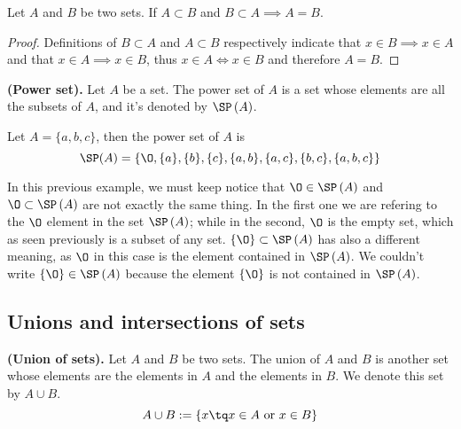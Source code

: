 \begin{proposition}
    Let $A$ and $B$ be two sets. If $A\subset B$ and $B\subset A\implies A = B$.
\end{proposition}
\begin{proof}
    Definitions of $B\subset A$ and $A\subset B$ respectively indicate that $x\in B\implies x\in A$ and that $x\in A\implies x\in B$, thus $x\in A\iff x\in B$ and therefore $A = B$.
\end{proof}

\begin{definition}
    \textbf{(Power set).} Let $A$ be a set. The power set of $A$ is a set whose elements are all the subsets of $A$, and it's denoted by $\SP\left( A \right) $.
\end{definition}
\begin{example}
    Let $A = \{a, b, c\}$, then the power set of $A$ is
    \begin{equation}
    \SP(A) = \lbrace \O, \{a\}, \{b\}, \{c\}, \{a, b\}, \{a, c\}, \{b, c\}, \{a, b, c\}\rbrace
    \end{equation}
\end{example}

In this previous example, we must keep notice that $\O\in\SP\left( A \right)$ and $\O\subset \SP\left( A \right)$ are not exactly the same thing. In the first one we are refering to the $\O$ element in the set $\SP\left( A \right)$; while in the second, $\O$ is the empty set, which as seen previously is a subset of any set. $\{\O\}\subset \SP\left( A \right)$ has also a different meaning, as $\O$ in this case is the element contained in $\SP\left( A \right)$. We couldn't write $\{\O\}\in \SP\left( A \right)$ because the element $\{\O\}$ is not contained in $\SP\left( A \right) $.

\subsection{Unions and intersections of sets}
\begin{definition}
    \textbf{(Union of sets).} Let $A$ and $B$ be two sets. The union of $A$ and $B$ is another set whose elements are the elements in $A$ and the elements in $B$. We denote this set by $A\cup B$.
    \begin{equation}
        A\cup B := \{x\tq x\in A\textrm{ or } x\in B\}
    \end{equation}
\end{definition}

